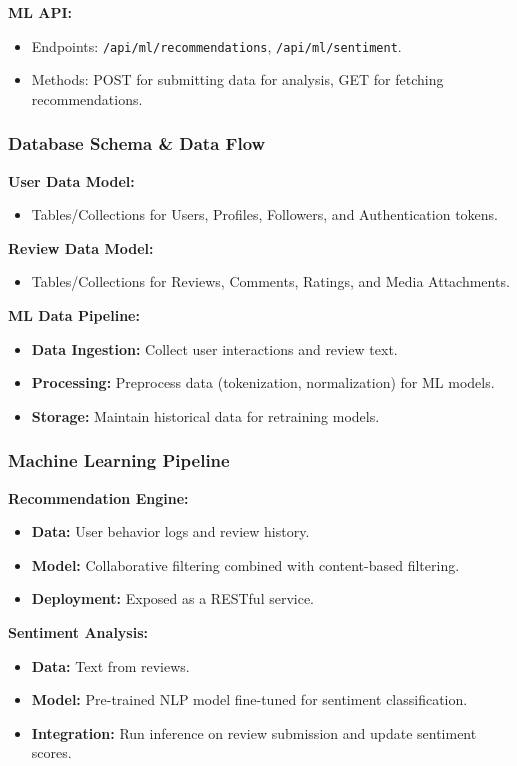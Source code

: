 \documentclass[11pt]{article}
\begin{document}
\textbf{ML API:}
\begin{itemize}[noitemsep]
    \item Endpoints: \texttt{/api/ml/recommendations}, \texttt{/api/ml/sentiment}.
    \item Methods: POST for submitting data for analysis, GET for fetching recommendations.
\end{itemize}

\subsubsection{Database Schema \& Data Flow}
\textbf{User Data Model:}
\begin{itemize}[noitemsep]
    \item Tables/Collections for Users, Profiles, Followers, and Authentication tokens.
\end{itemize}

\textbf{Review Data Model:}
\begin{itemize}[noitemsep]
    \item Tables/Collections for Reviews, Comments, Ratings, and Media Attachments.
\end{itemize}

\textbf{ML Data Pipeline:}
\begin{itemize}[noitemsep]
    \item \textbf{Data Ingestion:} Collect user interactions and review text.
    \item \textbf{Processing:} Preprocess data (tokenization, normalization) for ML models.
    \item \textbf{Storage:} Maintain historical data for retraining models.
\end{itemize}

\subsubsection{Machine Learning Pipeline}
\textbf{Recommendation Engine:}
\begin{itemize}[noitemsep]
    \item \textbf{Data:} User behavior logs and review history.
    \item \textbf{Model:} Collaborative filtering combined with content-based filtering.
    \item \textbf{Deployment:} Exposed as a RESTful service.
\end{itemize}

\textbf{Sentiment Analysis:}
\begin{itemize}[noitemsep]
    \item \textbf{Data:} Text from reviews.
    \item \textbf{Model:} Pre-trained NLP model fine-tuned for sentiment classification.
    \item \textbf{Integration:} Run inference on review submission and update sentiment scores.
\end{itemize}
\end{document}
